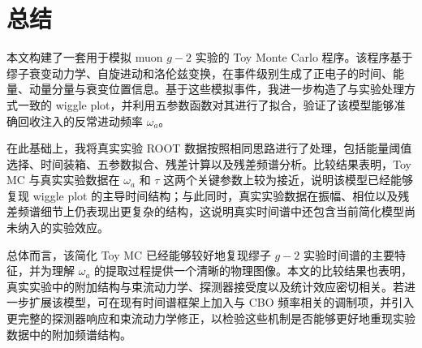 \documentclass[a4paper,11pt,AutoFakeBold]{ctexart}
\begin{document}
\newpage
\section{总结}

本文构建了一套用于模拟 muon $g-2$ 实验的 Toy Monte Carlo 程序。该程序基于缪子衰变动力学、自旋进动和洛伦兹变换，在事件级别生成了正电子的时间、能量、动量分量与衰变位置信息。基于这些模拟事件，我进一步构造了与实验处理方式一致的 wiggle plot，并利用五参数函数对其进行了拟合，验证了该模型能够准确回收注入的反常进动频率 $\omega_a$。

在此基础上，我将真实实验 ROOT 数据按照相同思路进行了处理，包括能量阈值选择、时间装箱、五参数拟合、残差计算以及残差频谱分析。比较结果表明，Toy MC 与真实实验数据在 $\omega_a$ 和 $\tau$ 这两个关键参数上较为接近，说明该模型已经能够复现 wiggle plot 的主导时间结构；与此同时，真实实验数据在振幅、相位以及残差频谱细节上仍表现出更复杂的结构，这说明真实时间谱中还包含当前简化模型尚未纳入的实验效应。

总体而言，该简化 Toy MC 已经能够较好地复现缪子 $g-2$ 实验时间谱的主要特征，并为理解 $\omega_a$ 的提取过程提供一个清晰的物理图像。本文的比较结果也表明，真实实验中的附加结构与束流动力学、探测器接受度以及统计效应密切相关。若进一步扩展该模型，可在现有时间谱框架上加入与 CBO 频率相关的调制项，并引入更完整的探测器响应和束流动力学修正，以检验这些机制是否能够更好地重现实验数据中的附加频谱结构。
\end{document}

